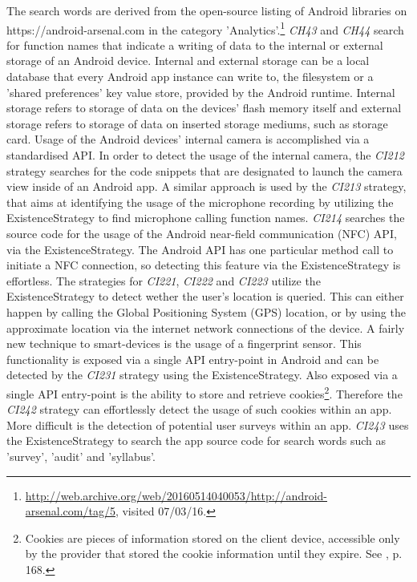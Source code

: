 The search words are derived from the open-source listing of Android libraries on https://android-arsenal.com in the category 'Analytics'.\footnote{\url{http://web.archive.org/web/20160514040053/http://android-arsenal.com/tag/5}, visited 07/03/16.}
\textit{CH43} and \textit{CH44} search for function names that indicate a writing of data to the internal or external storage of an Android device.
Internal and external storage can be a local database that every Android app instance can write to, the filesystem or a 'shared preferences' key value store, provided by the Android runtime.
Internal storage refers to storage of data on the devices' flash memory itself and external storage refers to storage of data on inserted storage mediums, such as storage card.
Usage of the Android devices' internal camera is accomplished via a standardised \acs{API}.
In order to detect the usage of the internal camera, the \textit{CI212} strategy searches for the code snippets that are designated to launch the camera view inside of an Android app.
A similar approach is used by the \textit{CI213} strategy, that aims at identifying the usage of the microphone recording by utilizing the ExistenceStrategy to find microphone calling function names.
\textit{CI214} searches the source code for the usage of the Android near-field communication (\acs{NFC}) API, via the ExistenceStrategy.
The Android API has one particular method call to initiate a NFC connection, so detecting this feature via the ExistenceStrategy is effortless.
The strategies for \textit{CI221}, \textit{CI222} and \textit{CI223} utilize the ExistenceStrategy to detect wether the user's location is queried.
This can either happen by calling the Global Positioning System (\acs{GPS}) location, or by using the approximate location via the internet network connections of the device.
A fairly new technique to smart-devices is the usage of a fingerprint sensor. 
This functionality is exposed via a single API entry-point in Android and can be detected by the \textit{CI231} strategy using the ExistenceStrategy.
Also exposed via a single API entry-point is the ability to store and retrieve cookies\footnote{Cookies are pieces of information stored on the client device, accessible only by the provider that stored the cookie information until they expire. See \cite{Laudon2010}, p. 168.}.
Therefore the \textit{CI242} strategy can effortlessly detect the usage of such cookies within an app.
More difficult is the detection of potential user surveys within an app.
\textit{CI243} uses the ExistenceStrategy to search the app source code for search words such as 'survey', 'audit' and 'syllabus'.

